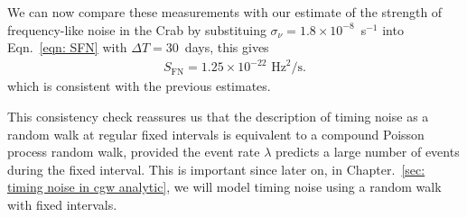 \documentclass[../full_thesis/full_thesis.tex]{subfiles}
\begin{document}
\begin{subappendices}
We can now compare these measurements with our estimate of the strength of
frequency-like noise in the Crab by substituing
$\sigma_{\nu}=1.8\times10^{-8}$~s$^{-1}$ into Eqn.~\eqref{eqn: SFN} with 
$\Delta T = 30$~days, this gives
\begin{align}
S_{\mathrm{FN}} = 1.25 \times 10^{-22} \textrm{ Hz}^{2}/\textrm{s}.
\end{align}
which is consistent with the previous estimates.

This consistency check reassures us that the description of timing noise as
a random walk at regular fixed intervals is equivalent to a compound Poisson
process random walk, provided the event rate $\lambda$ predicts a large number
of events during the fixed interval. This is important since later on, in
Chapter.~\ref{sec: timing noise in cgw analytic}, we will model timing noise
using a random walk with fixed intervals.
\end{subappendices}
\end{document}
